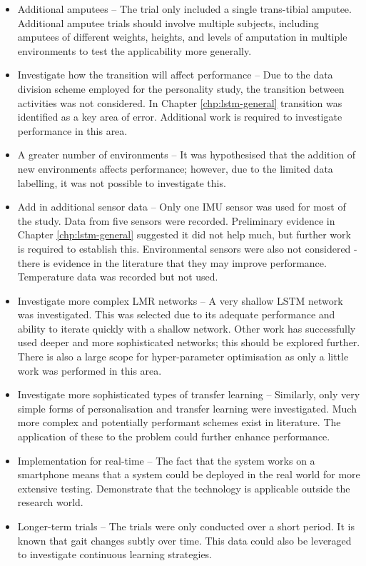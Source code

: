 \begin{itemize}
    \item Additional amputees --  The trial only included a single trans-tibial amputee. Additional amputee trials should involve multiple subjects, including amputees of different weights, heights, and levels of amputation in multiple environments to test the applicability more generally.
    \item Investigate how the transition will affect performance -- Due to the data division scheme employed for the personality study, the transition between activities was not considered. In Chapter \ref{chp:lstm-general} transition was identified as a key area of error. Additional work is required to investigate performance in this area.
    \item A greater number of environments -- It was hypothesised that the addition of new environments affects performance; however, due to the limited data labelling, it was not possible to investigate this.
    \item Add in additional sensor data -- Only one IMU sensor was used for most of the study. Data from five sensors were recorded. Preliminary evidence in Chapter \ref{chp:lstm-general} suggested it did not help much, but further work is required to establish this. Environmental sensors were also not considered - there is evidence in the literature that they may improve performance. Temperature data was recorded but not used.
    
    \item Investigate more complex LMR networks -- A very shallow LSTM network was investigated. This was selected due to its adequate performance and ability to iterate quickly with a shallow network. Other work has successfully used deeper and more sophisticated networks; this should be explored further. There is also a large scope for hyper-parameter optimisation as only a little work was performed in this area.
    \item Investigate more sophisticated types of transfer learning -- Similarly, only very simple forms of personalisation and transfer learning were investigated. Much more complex and potentially performant schemes exist in literature. The application of these to the problem could further enhance performance.
    
    \item Implementation for real-time -- The fact that the system works on a smartphone means that a system could be deployed in the real world for more extensive testing. Demonstrate that the technology is applicable outside the research world.
    \item Longer-term trials -- The trials were only conducted over a short period. It is known that gait changes subtly over time. This data could also be leveraged to investigate continuous learning strategies.
\end{itemize}

